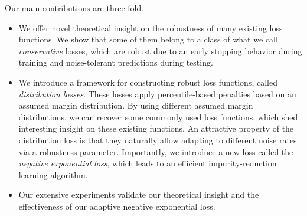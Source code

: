 \documentclass[letterpaper]{article} %
\begin{document}
Our main contributions are three-fold.
\begin{itemize}
	\item We offer novel theoretical insight on the robustness of many existing
		loss functions.
		We show that some of them belong to a class of what we call
		\emph{conservative} losses, which are robust due to an early stopping
		behavior during training and noise-tolerant predictions during testing.
	\item We introduce a framework for constructing robust loss functions, called
		\emph{distribution losses}.
		These losses apply percentile-based penalties based on an assumed margin
		distribution.
		By using different assumed margin distributions, we can recover some commonly
		used loss functions, which shed interesting insight on these existing
		functions.
		An attractive property of the distribution loss is that they naturally allow
		adapting to different noise rates via a robustness parameter. 
		Importantly, we introduce a new loss called the \emph{negative exponential loss},
		which leads to an efficient impurity-reduction learning algorithm.
	\item Our extensive experiments validate our theoretical insight and the
		effectiveness of our adaptive negative exponential loss. 
\end{itemize}


\end{document}
